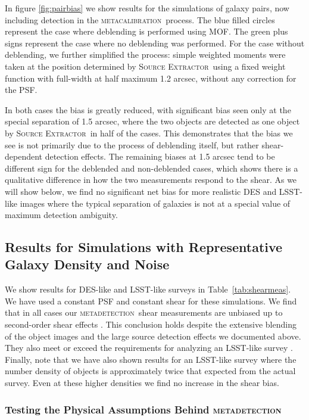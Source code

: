 \documentclass[fleqn,useAMS,usenatbib]{mnras}
\newcommand{\mcal}{\textsc{metacalibration}}
\newcommand{\mdet}{\textsc{metadetection}}
\newcommand{\sx}{\textsc{Source Extractor}}
\begin{document}
In figure \ref{fig:pairbias} we show results for the simulations of galaxy
pairs, now including detection in the \mcal\ process. The blue filled circles
represent the case where deblending is performed using MOF. The green plus
signs represent the case where no deblending was performed. For the case
without deblending,  we further simplified the process: simple weighted moments
were taken at the position determined by \sx\ using a fixed weight function
with full-width at half maximum 1.2 arcsec, without any correction for the PSF.

In both cases the bias is greatly reduced, with significant bias seen only at
the special separation of 1.5 arcsec, where the two objects are detected as one
object by \sx\ in half of the cases. This demonstrates that the bias we see is
not primarily due to the process of deblending itself, but rather
shear-dependent detection effects. The remaining biases at 1.5 arcsec tend to
be different sign for the deblended and non-deblended cases, which shows there
is a qualitative difference in how the two measurements respond to the shear.
As we will show below, we find no significant net bias for more realistic DES
and LSST-like images where the typical separation of galaxies is not at a
special value of maximum detection ambiguity.

\subsection{Results for Simulations with Representative Galaxy Density and Noise}
\label{sec:res:constpsf}

We show results for DES-like and LSST-like surveys in Table~\ref{tab:shearmeas}.
We have used a constant PSF and constant shear for these simulations. We find
that in all cases our \mdet\ shear measurements are unbiased up to
second-order shear effects \citep[we expect a bias of a few parts in 10000 for shears
of 0.02, see][]{SheldonMcal2017}. This conclusion holds despite the extensive blending
of the object images and the large source detection effects we documented
above. They also meet or exceed the requirements for analyzing an LSST-like survey
\citep[e.g.,][]{huterer2006}. Finally, note that we have also shown results for an
LSST-like survey where the number density of objects is approximately twice that
expected from the actual survey.  Even at these higher densities we find
no increase in the shear bias.

\subsubsection{Testing the Physical Assumptions Behind \mdet}
\end{document}
